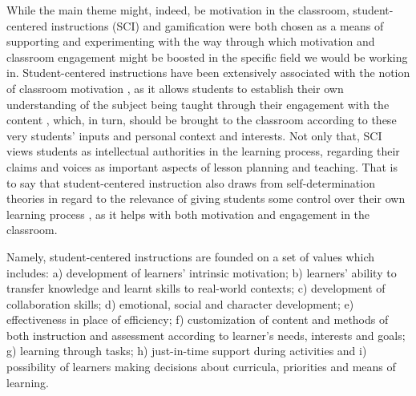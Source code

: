 \documentclass[english]{textolivre}
\begin{document}
While the main theme might, indeed, be motivation in the classroom, student-centered instructions (SCI) and gamification were both chosen as a means of supporting and experimenting with the way through which motivation and classroom engagement might be boosted in the specific field we would be working in. Student-centered instructions have been extensively associated with the notion of classroom motivation \cite{felder1996navigating}, as it allows students to establish their own understanding of the subject being taught through their engagement with the content \cite{talbert2019does}, which, in turn, should be brought to the classroom according to these very students’ inputs and personal context and interests. Not only that, SCI views students as intellectual authorities \cite{felder1996navigating, brown2000douglas} in the learning process, regarding their claims and voices as important aspects of lesson planning and teaching. That is to say that student-centered instruction also draws from self-determination theories \cite{ryan2009promoting} in regard to the relevance of giving students some control over their own learning process \cite{brown2000douglas}, as it helps with both motivation and engagement in the classroom.

Namely, student-centered instructions are founded on a set of values \cite{brown2000douglas, reigeluth2007instructional} which includes: a) development of learners’ intrinsic motivation; b) learners’ ability to transfer knowledge and learnt skills to real-world contexts; c) development of collaboration skills; d) emotional, social and character development; e) effectiveness in place of efficiency; f) customization of content and methods of both instruction and assessment according to learner’s needs, interests and goals; g) learning through tasks; h) just-in-time support during activities and i) possibility of learners making decisions about curricula, priorities and means of learning.
\end{document}
